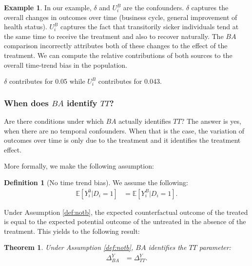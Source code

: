 \documentclass[
]{book}
\newcommand{\esp}[1]{\mathbb{E}[ #1 ]}
\newtheorem{theorem}{Theorem}[chapter]
\theoremstyle{definition}
\newtheorem{definition}{Definition}[chapter]
\theoremstyle{definition}
\newtheorem{example}{Example}[chapter]
\theoremstyle{definition}
\theoremstyle{definition}
\theoremstyle{remark}
\begin{document}
\begin{example}
\protect\hypertarget{exm:unnamed-chunk-29}{}{\label{exm:unnamed-chunk-29} }In our example, \(\delta\) and \(U_i^B\) are the confounders.
\(\delta\) captures the overall changes in outcomes over time (business cycle, general improvement of health status).
\(U^B_i\) captures the fact that transitorily sicker individuals tend at the same time to receive the treatment and also to recover naturally.
The \(BA\) comparison incorrectly attributes both of these changes to the effect of the treatment.
We can compute the relative contributions of both sources to the overall time-trend bias in the population.
\end{example}
\(\delta\) contributes for 0.05 while \(U^B_i\) contributes for 0.043.

\hypertarget{when-does-ba-identify-tt}{%
\subsubsection{\texorpdfstring{When does \(BA\) identify \(TT\)?}{When does BA identify TT?}}\label{when-does-ba-identify-tt}}

Are there conditions under which \(BA\) actually identifies \(TT\)?
The answer is yes, when there are no temporal confounders.
When that is the case, the variation of outcomes over time is only due to the treatment and it identifies the treatment effect.

More formally, we make the following assumption:

\begin{definition}[No time trend bias]
\protect\hypertarget{def:notb}{}{\label{def:notb} \iffalse (No time trend bias) \fi{} }We assume the following:
\begin{align*}
\esp{Y_i^0|D_i=1} & = \esp{Y_i^B|D_i=1}.
\end{align*}
\end{definition}

Under Assumption \ref{def:notb}, the expected counterfactual outcome of the treated is equal to the expected potential outcome of the untreated in the absence of the treatment.
This yields to the following result:

\begin{theorem}
\protect\hypertarget{thm:batt}{}{\label{thm:batt} }Under Assumption \ref{def:notb}, \(BA\) identifies the \(TT\) parameter:
\begin{align*}
\Delta^Y_{BA} & = \Delta^Y_{TT}.
\end{align*}
\end{theorem}
\end{document}

